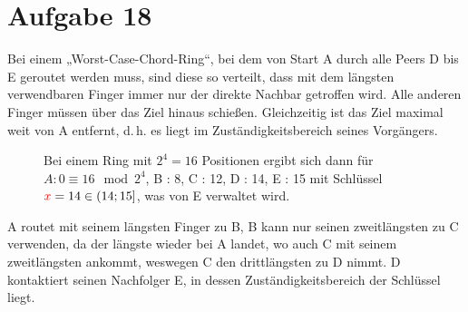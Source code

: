 \documentclass[10pt,a4paper]{article}
\begin{document}
\section*{Aufgabe 18}
Bei einem „Worst-Case-Chord-Ring“, bei dem von Start A durch alle Peers D bis E geroutet werden muss, sind diese so verteilt, dass mit dem längsten verwendbaren Finger immer nur der direkte Nachbar getroffen wird. Alle anderen Finger müssen über das Ziel hinaus schießen. Gleichzeitig ist das Ziel maximal weit von A entfernt, d.\,h. es liegt im Zuständigkeitsbereich seines Vorgängers.



\begin{SCfigure}[\sidecaptionrelwidth][!hb]

    \caption{Bei einem Ring mit $2^{4}=16$ Positionen ergibt sich dann für\mbox{$A : 0 \equiv 16\mod2^{4}$}, B : 8, C : 12, D : 14, E : 15 mit Schlüssel \mbox{$\textcolor{red}{x}=14 \in (14;15]$}, was von E verwaltet wird.}
	\centering
{}

\label{fig:Ring}
\end{SCfigure}

A routet mit seinem längsten Finger zu B, B kann nur seinen zweitlängsten zu C verwenden, da der längste wieder bei A landet, wo auch C mit seinem zweitlängsten ankommt, weswegen C den drittlängsten zu D nimmt. D kontaktiert seinen Nachfolger E, in dessen Zuständigkeitsbereich der Schlüssel liegt.
\end{document}
